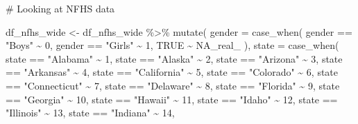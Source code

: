 \documentclass[
  letterpaper,
  DIV=11,
  numbers=noendperiod]{scrartcl}
\newenvironment{Shaded}{\begin{snugshade}}{\end{snugshade}}
\newcommand{\AttributeTok}[1]{\textcolor[rgb]{0.40,0.45,0.13}{#1}}
\newcommand{\CommentTok}[1]{\textcolor[rgb]{0.37,0.37,0.37}{#1}}
\newcommand{\ConstantTok}[1]{\textcolor[rgb]{0.56,0.35,0.01}{#1}}
\newcommand{\DecValTok}[1]{\textcolor[rgb]{0.68,0.00,0.00}{#1}}
\newcommand{\FunctionTok}[1]{\textcolor[rgb]{0.28,0.35,0.67}{#1}}
\newcommand{\NormalTok}[1]{\textcolor[rgb]{0.00,0.23,0.31}{#1}}
\newcommand{\OtherTok}[1]{\textcolor[rgb]{0.00,0.23,0.31}{#1}}
\newcommand{\SpecialCharTok}[1]{\textcolor[rgb]{0.37,0.37,0.37}{#1}}
\newcommand{\StringTok}[1]{\textcolor[rgb]{0.13,0.47,0.30}{#1}}
\begin{document}
\begin{Shaded}
\begin{Highlighting}[]
\CommentTok{\# Looking at NFHS data}

\NormalTok{df\_nfhs\_wide }\OtherTok{\textless{}{-}}\NormalTok{ df\_nfhs\_wide }\SpecialCharTok{\%\textgreater{}\%}
  \FunctionTok{mutate}\NormalTok{(}
    \AttributeTok{gender =} \FunctionTok{case\_when}\NormalTok{(}
\NormalTok{      gender }\SpecialCharTok{==} \StringTok{"Boys"} \SpecialCharTok{\textasciitilde{}} \DecValTok{0}\NormalTok{,}
\NormalTok{      gender }\SpecialCharTok{==} \StringTok{"Girls"} \SpecialCharTok{\textasciitilde{}} \DecValTok{1}\NormalTok{,}
      \ConstantTok{TRUE} \SpecialCharTok{\textasciitilde{}} \ConstantTok{NA\_real\_}
\NormalTok{    ),}
    \AttributeTok{state =} \FunctionTok{case\_when}\NormalTok{(}
\NormalTok{      state }\SpecialCharTok{==} \StringTok{"Alabama"} \SpecialCharTok{\textasciitilde{}} \DecValTok{1}\NormalTok{,}
\NormalTok{      state }\SpecialCharTok{==} \StringTok{"Alaska"} \SpecialCharTok{\textasciitilde{}} \DecValTok{2}\NormalTok{,}
\NormalTok{      state }\SpecialCharTok{==} \StringTok{"Arizona"} \SpecialCharTok{\textasciitilde{}} \DecValTok{3}\NormalTok{,}
\NormalTok{      state }\SpecialCharTok{==} \StringTok{"Arkansas"} \SpecialCharTok{\textasciitilde{}} \DecValTok{4}\NormalTok{,}
\NormalTok{      state }\SpecialCharTok{==} \StringTok{"California"} \SpecialCharTok{\textasciitilde{}} \DecValTok{5}\NormalTok{,}
\NormalTok{      state }\SpecialCharTok{==} \StringTok{"Colorado"} \SpecialCharTok{\textasciitilde{}} \DecValTok{6}\NormalTok{,}
\NormalTok{      state }\SpecialCharTok{==} \StringTok{"Connecticut"} \SpecialCharTok{\textasciitilde{}} \DecValTok{7}\NormalTok{,}
\NormalTok{      state }\SpecialCharTok{==} \StringTok{"Delaware"} \SpecialCharTok{\textasciitilde{}} \DecValTok{8}\NormalTok{,}
\NormalTok{      state }\SpecialCharTok{==} \StringTok{"Florida"} \SpecialCharTok{\textasciitilde{}} \DecValTok{9}\NormalTok{,}
\NormalTok{      state }\SpecialCharTok{==} \StringTok{"Georgia"} \SpecialCharTok{\textasciitilde{}} \DecValTok{10}\NormalTok{,}
\NormalTok{      state }\SpecialCharTok{==} \StringTok{"Hawaii"} \SpecialCharTok{\textasciitilde{}} \DecValTok{11}\NormalTok{,}
\NormalTok{      state }\SpecialCharTok{==} \StringTok{"Idaho"} \SpecialCharTok{\textasciitilde{}} \DecValTok{12}\NormalTok{,}
\NormalTok{      state }\SpecialCharTok{==} \StringTok{"Illinois"} \SpecialCharTok{\textasciitilde{}} \DecValTok{13}\NormalTok{,}
\NormalTok{      state }\SpecialCharTok{==} \StringTok{"Indiana"} \SpecialCharTok{\textasciitilde{}} \DecValTok{14}\NormalTok{,}

\end{Highlighting}
\end{Shaded}
\end{document}
